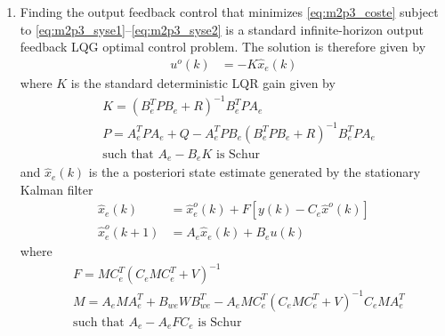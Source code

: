 \begin{enumerate}
    \item
    Finding the output feedback control that minimizes \eqref{eq:m2p3_coste} subject to \eqref{eq:m2p3_syse1}--\eqref{eq:m2p3_syse2} is a standard infinite-horizon output feedback LQG optimal control problem. The solution is therefore given by
    \begin{align*}
        u^o(k) & = -K \hat{x}_e(k)
    \end{align*}
    where $K$ is the standard deterministic LQR gain given by
    \begin{align*}
        & K = (B_e^T P B_e + R)^{-1} B_e^T P A_e \\
        & P = A_e^T P A_e + Q - A_e^T P B_e ( B_e^T P B_e + R)^{-1} B_e^T P A_e \\
        & \textrm{such that } A_e - B_e K \textrm{ is Schur}
    \end{align*}
    and $\hat{x}_e(k)$ is the a posteriori state estimate generated by the stationary Kalman filter
    \begin{align*}
        \hat{x}_e(k) & = \hat{x}_e^o(k) + F [y(k) - C_e \hat{x}^o(k)] \\
        \hat{x}_e^o(k+1) & = A_e \hat{x}_e(k) + B_e u(k)
    \end{align*}
    where
    \begin{align*}
        & F = M C_e^T (C_e M C_e^T + V)^{-1} \\
        & M = A_e M A_e^T + B_{we} W B_{we}^T - A_e M C_e^T (C_e M C_e^T + V)^{-1} C_e M A_e^T \\
        & \textrm{such that } A_e - A_e F C_e \textrm{ is Schur}
    \end{align*}
    
\end{enumerate} 